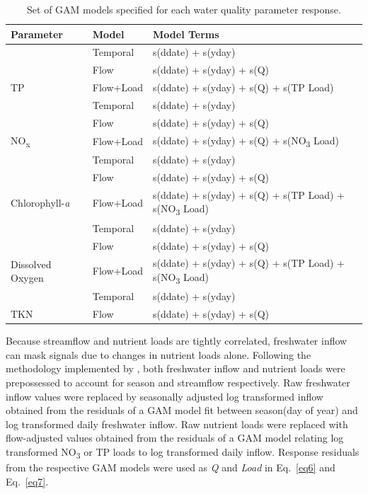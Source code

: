 \documentclass[fleqn,10pt,lineno]{wlpeerj} %
\begin{document}
\begin{table}

\caption{\label{tab:table3}Set of GAM models specified for each water quality parameter response.}
\centering
\begin{tabular}[t]{lll}
\toprule
Parameter & Model & Model Terms\\
\midrule
 & Temporal & s(ddate) + s(yday)\\

 & Flow & s(ddate) + s(yday) + s(Q)\\

\multirow{-3}{*}{\raggedright\arraybackslash TP} & Flow+Load & s(ddate) + s(yday) + s(Q) + s(TP Load)\\
\cmidrule{1-3}
 & Temporal & s(ddate) + s(yday)\\

 & Flow & s(ddate) + s(yday) + s(Q)\\

\multirow{-3}{*}{\raggedright\arraybackslash NO\textsubscript{x}} & Flow+Load & s(ddate) + s(yday) + s(Q) + s(NO\textsubscript{3} Load)\\
\cmidrule{1-3}
 & Temporal & s(ddate) + s(yday)\\

 & Flow & s(ddate) + s(yday) + s(Q)\\

\multirow{-3}{*}{\raggedright\arraybackslash Chlorophyll-\textit{a}} & Flow+Load & s(ddate) + s(yday) + s(Q) + s(TP Load) + s(NO\textsubscript{3} Load)\\
\cmidrule{1-3}
 & Temporal & s(ddate) + s(yday)\\

 & Flow & s(ddate) + s(yday) + s(Q)\\

\multirow{-3}{*}{\raggedright\arraybackslash Dissolved Oxygen} & Flow+Load & s(ddate) + s(yday) + s(Q) + s(TP Load) + s(NO\textsubscript{3}  Load)\\
\cmidrule{1-3}
 & Temporal & s(ddate) + s(yday)\\

\multirow{-2}{*}{\raggedright\arraybackslash TKN} & Flow & s(ddate) + s(yday) + s(Q)\\
\bottomrule
\end{tabular}
\end{table}

Because streamflow and nutrient loads are tightly correlated, freshwater
inflow can mask signals due to changes in nutrient loads alone.
Following the methodology implemented by
\textcite{murphyNutrientImprovementsChesapeake2022}, both freshwater
inflow and nutrient loads were prepossessed to account for season and
streamflow respectively. Raw freshwater inflow values were replaced by
seasonally adjusted log transformed inflow obtained from the residuals
of a GAM model fit between season(day of year) and log transformed daily
freshwater inflow. Raw nutrient loads were replaced with flow-adjusted
values obtained from the residuals of a GAM model relating log
transformed NO\textsubscript{3} or TP loads to log transformed daily
inflow. Response residuals from the respective GAM models were used as
\emph{Q} and \emph{Load} in Eq.~\ref{eq6} and Eq.~\ref{eq7}.
\end{document}
